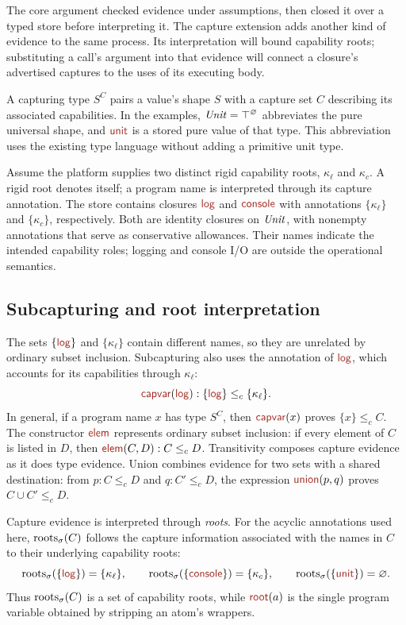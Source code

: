 \label{sec:capture}

The core argument checked evidence under assumptions, then closed it over
a typed store before interpreting it. The capture extension adds another
kind of evidence to the same process. Its interpretation will bound
capability roots; substituting a call's argument into that evidence will
connect a closure's advertised captures to the uses of its executing body.

A capturing type $S^C$ pairs a value's shape $S$ with a capture set $C$
describing its associated capabilities. In the examples,
$\mathit{Unit}=\top^\varnothing$ abbreviates the pure universal shape, and
$\ev{unit}$ is a stored pure value of that type. This abbreviation uses
the existing type language without adding a primitive unit type.

Assume the platform supplies two distinct rigid capability roots,
$\kappa_{\ell}$ and $\kappa_c$. A rigid root denotes itself; a program
name is interpreted through its capture annotation. The store contains
closures $\ev{log}$ and $\ev{console}$ with annotations
$\{\kappa_{\ell}\}$ and $\{\kappa_c\}$, respectively. Both are identity
closures on $\mathit{Unit}$, with nonempty annotations that serve as
conservative allowances. Their names indicate the intended capability
roles; logging and console I/O are outside the operational semantics.

\subsection*{Subcapturing and root interpretation}
The sets $\{\ev{log}\}$ and $\{\kappa_{\ell}\}$ contain different names,
so they are unrelated by ordinary subset inclusion. Subcapturing also
uses the annotation of $\ev{log}$, which accounts for its capabilities
through $\kappa_{\ell}$:
\[
 \ev{capvar}(\ev{log}):
       \{\ev{log}\}\le_c\{\kappa_{\ell}\}.
\]
In general, if a program name $x$ has type $S^C$, then
$\ev{capvar}(x)$ proves $\{x\}\le_c C$.
The constructor $\ev{elem}$ represents ordinary subset inclusion:
if every element of $C$ is listed in $D$, then
$\ev{elem}(C,D):C\le_c D$.
Transitivity composes capture evidence as it does type evidence.
Union combines evidence for two sets with a shared destination:
from $p:C\le_c D$ and $q:C'\le_c D$, the expression
$\ev{union}(p,q)$ proves $C\cup C'\le_c D$.

Capture evidence is interpreted through \emph{roots}. For the acyclic
annotations used here, $\operatorname{roots}_{\sigma}(C)$ follows the capture information
associated with the names in $C$ to their underlying capability roots:
\[
 \roots{\{\ev{log}\}}=\{\kappa_{\ell}\},\qquad
 \roots{\{\ev{console}\}}=\{\kappa_c\},\qquad
 \roots{\{\ev{unit}\}}=\varnothing.
\]
Thus $\operatorname{roots}_{\sigma}(C)$ is a set of capability roots, while $\ev{root}(a)$ is
the single program variable obtained by stripping an atom's wrappers.

